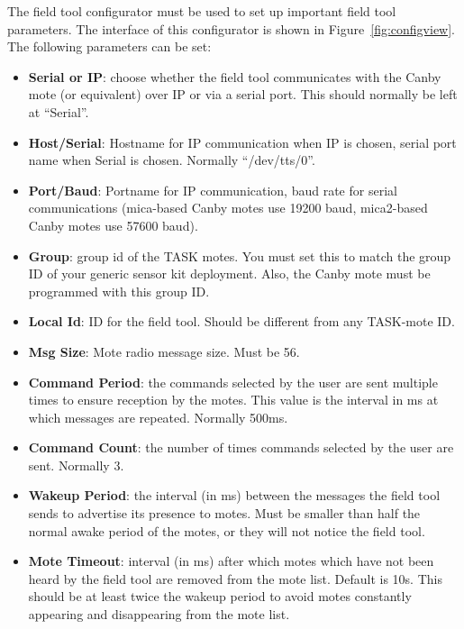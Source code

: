 \documentclass{article}
\begin{document}
The field tool configurator must be used to set up important field tool
parameters. The interface of this configurator is shown in Figure~\ref{fig:configview}. The following parameters can be set:
\begin{itemize}
\item {\bf Serial or IP}: choose whether the field tool communicates with
the Canby mote (or equivalent) over IP or via a serial port. This should
normally be left at ``Serial''.

\item {\bf Host/Serial}: Hostname for IP communication when IP is chosen,
serial port name when Serial is chosen. Normally ``/dev/tts/0''.

\item {\bf Port/Baud}: Portname for IP communication, baud rate for serial
communications (mica-based Canby motes use 19200 baud, mica2-based Canby
motes use 57600 baud).

\item {\bf Group}: group id of the TASK motes. You must set this to match
the group ID of your generic sensor kit deployment. Also, the Canby mote
must be programmed with this group ID.

\item {\bf Local Id}: ID for the field tool. Should be different from
any TASK-mote ID.

\item {\bf Msg Size}: Mote radio message size. Must be 56.

\item {\bf Command Period}: the commands selected by the user are sent
multiple times to ensure reception by the motes. This value is the interval 
in ms at which messages are repeated. Normally 500ms.

\item {\bf Command Count}: the number of times commands selected by the user
are sent. Normally 3.

\item {\bf Wakeup Period}: the interval (in ms) between the messages the
field tool sends to advertise its presence to motes. Must be smaller than
half the normal awake period of the motes, or they will not notice the
field tool.

\item {\bf Mote Timeout}: interval (in ms) after which motes which have not
been heard by the field tool are removed from the mote list. Default is 10s.
This should be at least twice the wakeup period to avoid motes constantly
appearing and disappearing from the mote list.

\end{itemize}
\end{document}
